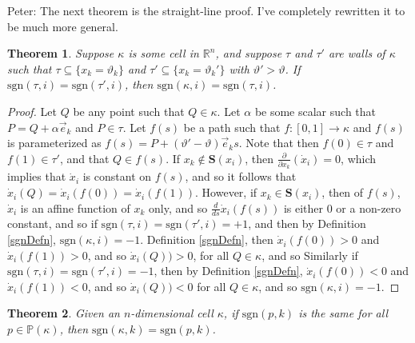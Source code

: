 \documentclass[12pt]{article}
\newtheorem{theorem}{Theorem}[section]
\theoremstyle{definition}
\theoremstyle{remark}
\newcommand\sgn{\text{sgn}}
\newcommand{\bbP}{\mathbb{P}}
\begin{document}
{\color{cyan} Peter: The next theorem is the straight-line proof. I've completely rewritten it to be much more general.}

\begin{theorem} \label{straightlineproof}
Suppose $\kappa$ is some cell in $\mathbb{R}^n$, and suppose $\tau$ and $\tau'$ are walls of $\kappa$ such that $\tau \subseteq \{x_k=\vartheta_k\}$ and $\tau' \subseteq \{x_k=\vartheta_k'\}$ with $\vartheta' > \vartheta$. If $\sgn(\tau,i)=\sgn(\tau',i)$, then $\sgn(\kappa,i)=\sgn(\tau,i)$.
\end{theorem}

\begin{proof}
Let $Q$ be any point such that $Q\in\kappa$. Let $\alpha$ be some scalar such that $P=Q +\alpha \vec e_k $ and $P \in \tau$. Let $f(s)$ be a path such that $f:[0,1]\to\kappa$ and $f(s)$ is parameterized as $f(s)=  P + (\vartheta'-\vartheta)\vec e_ks$.  Note that then $f(0) \in \tau$ and $f(1) \in \tau'$, and that $Q\in f(s)$. If $x_k \notin \mathbf{S}(x_i)$, then $\frac{\partial}{\partial x_k}(\dot x_i)=0$, which implies that $\dot x_i$ is constant on $f(s)$, and so it follows that $\dot x_i (Q)=\dot x_i (f(0))=\dot x_i (f(1))$. However, if $x_k \in \mathbf{S}(x_i)$, then of $f(s)$, $\dot x_i$ is an affine function of $x_k$ only, and so $\frac{d}{ds}\dot x_i(f(s))$ is either $0$ or a non-zero constant, and so if $\sgn(\tau,i)=\sgn(\tau',i)=+1$, and then by Definition \ref{sgnDefn}, $\sgn(\kappa,i)=-1$. Definition \ref{sgnDefn}, then $\dot x_i (f(0))>0$ and $\dot x_i (f(1))>0$, and so $\dot x_i (Q))>0$, for all $Q\in\kappa$, and so Similarly if $\sgn(\tau,i)=\sgn(\tau',i)=-1$, then by Definition \ref{sgnDefn}, $\dot x_i (f(0))<0$ and $\dot x_i (f(1))<0$, and so $\dot x_i (Q))<0$ for all $Q\in \kappa$, and so $\sgn(\kappa,i)=-1$.
\end{proof}

\begin{theorem} \label{cornerpointproof}
Given an $n$-dimensional cell $\kappa$, if $\sgn(p,k)$ is the same for all $p\in \bbP (\kappa)$,  then $\sgn(\kappa,k)=\sgn(p,k)$. 
\end{theorem}
\end{document}

